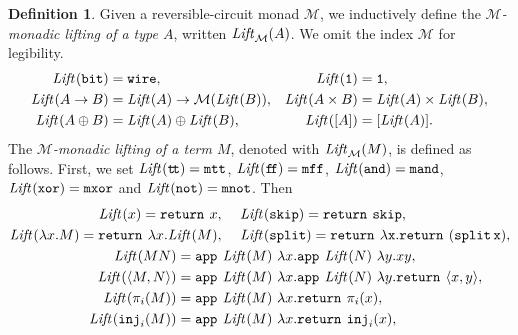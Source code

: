 \documentclass{article}
\theoremstyle{plain}
\theoremstyle{definition}
\newtheorem{definition}[theorem]{Definition}
\newcommand{\bit}{{\tt bit}}
\newcommand{\define}[1]{{\em #1}}
\newcommand{\listtype}[1]{{[}{#1}{]}}
\newcommand{\unittype}{{\tt 1}}
\newcommand{\tunit}{\unittype}
\newcommand{\punit}{\mathtt{skip}}\newcommand{\prodterm}[1]{{\langle{#1}\rangle}}
\newcommand{\ttrue}{\mathtt{t\!t}}
\newcommand{\ffalse}{\mathtt{f\!f}}
\newcommand{\inj}{{\tt inj}}
\newcommand{\monadreturn}{{\tt return}}
\newcommand{\monadapp}{{\tt app}}
\newcommand{\Lift}[1]{{\it Lift}_{\mathcal{#1}}}
\newcommand{\wiretype}{{\tt wire}}
\newcommand{\monadttrue}{{\tt mtt}}
\newcommand{\monadffalse}{{\tt mff}}
\newcommand{\monadand}{{\tt mand}}
\newcommand{\monadxor}{{\tt mxor}}
\newcommand{\monadnot}{{\tt mnot}}
\begin{document}
\begin{definition}\rm
  Given a reversible-circuit monad $\mathcal{M}$, we inductively define the
  \define{$\mathcal{M}$-monadic lifting of a type $A$}, written
  $\Lift{M}(A)$. We omit the index
  $\mathcal{M}$ for legibility.
  {\begin{align*}
    \Lift{}(\bit) 
    &= 
    \wiretype,
    &
    \Lift{}(\tunit) 
    &= 
    \tunit,
    \\
    \Lift{}(A\to B)
    &=
    \Lift{}(A) \to \mathcal{M}(\Lift{}(B)),
    &
    \Lift{}(A\times B)
    &=
    \Lift{}(A) \times\Lift{}(B),
    \\
    \Lift{}(A\oplus B)
    &=
    \Lift{}(A) \oplus \Lift{}(B),
    &
    \Lift{}(\listtype{A})
    &=
    \listtype{\Lift{}(A)}.
  \end{align*}}
  The \define{$\mathcal{M}$-monadic lifting of a term $M$}, denoted with
  $\Lift{M}(M)$, is defined as follows. First, we set $\Lift{}(\ttrue) = \monadttrue$,
    $\Lift{}(\ffalse) 
    =
    \monadffalse$, 
    $\Lift{}({\tt and}) 
    =
    \monadand$,
    $\Lift{}({\tt xor}) 
    =
    \monadxor$ and 
    $
    \Lift{}({\tt not}) 
    =
    \monadnot$. Then
  {\begin{align*}
    \Lift{}(x) 
    = 
    \monadreturn_{\mathcal{}}~x,
    \hspace{-9ex}~~&~~\hspace{9ex}
    \Lift{}(\punit) 
    = 
    \monadreturn_{\mathcal{}}~\punit,
    \\
    \Lift{}(\lambda x.M)
    = 
    \monadreturn_{\mathcal{}}~ \lambda x.\Lift{}(M),            
    \hspace{-9ex}~~&~~\hspace{9ex}
    \Lift{}(\tt split)
    =
    \monadreturn_{\mathcal{}}~ \lambda x.\monadreturn_{\mathcal{}}~({\tt split}\,x),
    \\
   \Lift{}(MN)
    &= 
    \monadapp_{\mathcal{}}~\Lift{}(M)~
    \lambda x.
    \monadapp_{\mathcal{}}~\Lift{}(N)~
    \lambda y.xy,
    \\
    \Lift{}(\prodterm{M,N})
    &= 
    \monadapp_{\mathcal{}}~\Lift{}(M)~
    \lambda x.
    \monadapp_{\mathcal{}}~\Lift{}(N)~
    \lambda y.\monadreturn_{\mathcal{}}~\prodterm{x,y},
    \\
    \Lift{}(\pi_i(M))
    &=
    \monadapp_{\mathcal{}}~\Lift{}(M)~
    \lambda x.\monadreturn_{\mathcal{}}~\pi_i(x),
    \\
    \Lift{}(\inj_i(M))
    &=
    \monadapp_{\mathcal{}}~\Lift{}(M)~
    \lambda x.\monadreturn_{\mathcal{}}~\inj_i(x),

\end{align*}}
\end{definition}
\end{document}
